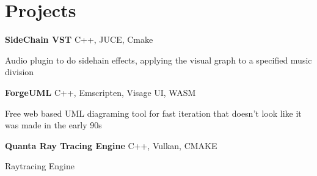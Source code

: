 
\newenvironment{twocolentry_proj}[2][]{
    \onecolentry
    \def\secondColumn{#2}
    \setcolumnwidth{\fill, 7 cm}
    \begin{paracol}{2}
}{
    \switchcolumn \raggedleft \secondColumn
    \end{paracol}
    \endonecolentry
} %

\vspace{5 pt - 0.5 cm}
\section{Projects}
\begin{twocolentry_proj}{
    \mbox{}%
}
\fontsize{11 pt}{11 pt}\textbf{SideChain VST} C++, JUCE, Cmake
\end{twocolentry_proj}

\begin{onecolentry}
    \begin{highlights}
        \item Audio plugin to do sidehain effects, applying the visual graph to a specified music division
    \end{highlights}
\end{onecolentry}

\vspace{0.10 cm}
\begin{twocolentry_proj}{
    \mbox{}%
}
\fontsize{11 pt}{11 pt}\textbf{ForgeUML} C++, Emscripten, Visage UI, WASM
\end{twocolentry_proj}
\begin{onecolentry}
    \begin{highlights}
        \item Free web based UML diagraming tool for fast iteration that doesn't look like it was made in the early 90s
    \end{highlights}
\end{onecolentry}

\vspace{0.10 cm}
\begin{twocolentry_proj}{
    \mbox{}%
}
\fontsize{11 pt}{11 pt}\textbf{Quanta Ray Tracing Engine} C++, Vulkan, CMAKE
\end{twocolentry_proj}
\begin{onecolentry}
    \begin{highlights}
        \item Raytracing Engine
    \end{highlights}
\end{onecolentry}
